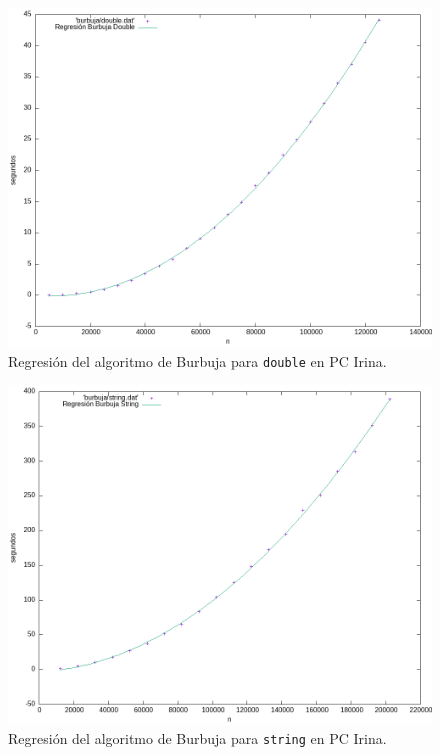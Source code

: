 \documentclass[12pt]{article}
\begin{document}
    \begin{figure}
        \centering
        \includegraphics[width=0.8\linewidth]{images/Burbuja/graficos/ajusteDouble.png}
        \cprotect\caption{Regresión del algoritmo de Burbuja para \verb|double| en PC Irina.}
        \label{fig:Burbuja_ajuste_double_graf}
    \end{figure}
    \begin{figure}
        \centering
        \includegraphics[width=0.8\linewidth]{images/Burbuja/graficos/ajusteString.png}
        \cprotect\caption{Regresión del algoritmo de Burbuja para \verb|string| en PC Irina.}
        \label{fig:Burbuja_ajuste_string_graf}
    \end{figure}
\end{document}
